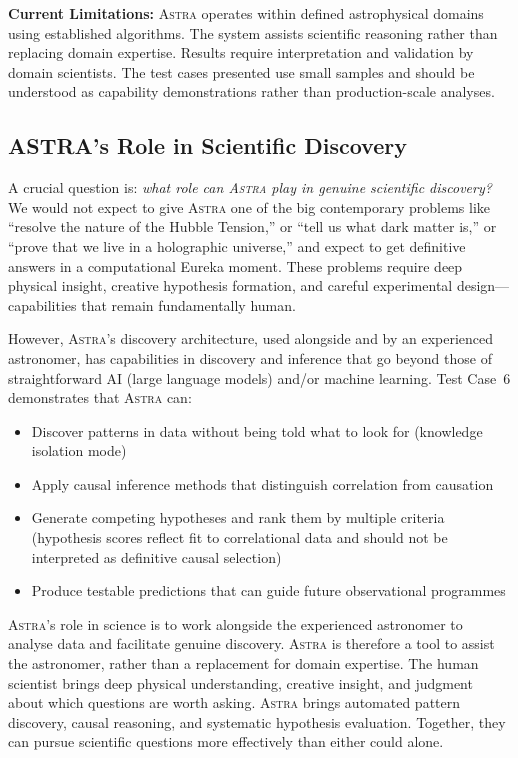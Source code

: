 \documentclass[fleqn,usenatbib]{mnras}
\newcommand{\astra}{\textsc{Astra}\xspace}
\begin{document}
\textbf{Current Limitations:}
\astra operates within defined astrophysical domains using established algorithms.
The system assists scientific reasoning rather than replacing domain expertise.
Results require interpretation and validation by domain scientists.
The test cases presented use small samples and should be understood as capability demonstrations rather than production-scale analyses.

\subsection{ASTRA's Role in Scientific Discovery}
\label{sec:discussion:role}

A crucial question is: \emph{what role can \astra play in genuine scientific discovery?}
We would not expect to give \astra one of the big contemporary problems like ``resolve the nature of the Hubble Tension,'' or ``tell us what dark matter is,'' or ``prove that we live in a holographic universe,'' and expect to get definitive answers in a computational Eureka moment.
These problems require deep physical insight, creative hypothesis formation, and careful experimental design---capabilities that remain fundamentally human.

However, \astra's discovery architecture, used alongside and by an experienced astronomer, has capabilities in discovery and inference that go beyond those of straightforward AI (large language models) and/or machine learning.
Test Case~6 demonstrates that \astra can:
\begin{itemize}
  \item Discover patterns in data without being told what to look for (knowledge isolation mode)
  \item Apply causal inference methods that distinguish correlation from causation
  \item Generate competing hypotheses and rank them by multiple criteria (hypothesis scores reflect fit to correlational data and should not be interpreted as definitive causal selection)
  \item Produce testable predictions that can guide future observational programmes
\end{itemize}

\astra's role in science is to work alongside the experienced astronomer to analyse data and facilitate genuine discovery.
\astra is therefore a tool to assist the astronomer, rather than a replacement for domain expertise.
The human scientist brings deep physical understanding, creative insight, and judgment about which questions are worth asking.
\astra brings automated pattern discovery, causal reasoning, and systematic hypothesis evaluation.
Together, they can pursue scientific questions more effectively than either could alone.
\end{document}

